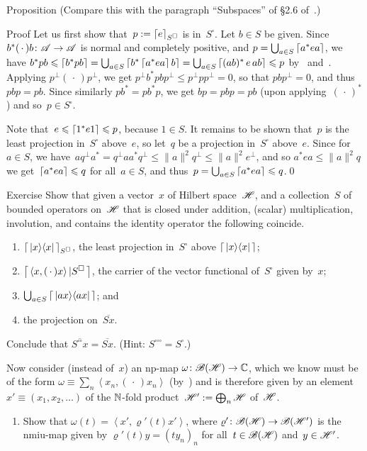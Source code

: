 \documentclass[a]{subfiles}
\begin{document}
\begin{parsec}
\begin{point}{Proposition}
(Compare this with the paragraph ``Subspaces'' of \S2.6 of~\cite{kr}.)
\begin{point}{Proof}%
Let us first show that~$p:= \left\lceil e\right\rceil_{S^\square}$
is in~$S^\square$.
Let $b\in S$ be given.
Since~$b^*(\,\cdot\,)b\colon \mathscr{A}\to\mathscr{A}$
is normal and completely positive,
and $p=\bigcup_{a\in S} \left\lceil a^*ea\right\rceil$,
we have $b^*pb\leqslant \left\lceil b^*pb\right\rceil = 
\bigcup_{a\in S} \left\lceil b^* \left\lceil a^* e a\right\rceil b \right\rceil
= \bigcup_{a\in S} \left\lceil(ab)^* \,e\, ab\right\rceil \leqslant p$
by~ and~.
Applying $p^\perp(\,\cdot\,)p^\perp$,
we get $p^\perp b^*pb p^\perp 
\leq p^\perp p p^\perp = 0$,
so that $pbp^\perp=0$,
and thus $pbp=pb$.
Since similarly $pb^* =pb^*p$,
we get  $bp=pbp=pb$
(upon applying~$(\,\cdot\,)^*$) and so~$p\in S^\square$.

Note that~$e\leqslant \left\lceil1^* e 1\right\rceil\leqslant p$, because $1\in S$.
It remains to be shown that~$p$ is the least projection in~$S^\square$
above~$e$, so let~$q$ be a projection in~$S^\square$ above~$e$.
Since for~$a\in S$,
we have~$aq^\perp a^*=  q^\perp aa^* q^\perp 
\leq \|a\|^2q^\perp \leq \|a\|^2e^\perp$,
and so $a^*ea\leq \|a\|^2q$ 
we get~$\left\lceil a^*ea\right\rceil\leqslant q$
for all~$a\in S$,
and thus~$p=\bigcup_{a\in S}\left\lceil a^*ea\right\rceil \leqslant q$.\qed
\end{point}
\end{point}

\begin{point}{Exercise}%
Show that given a vector~$x$ of Hilbert space~$\mathscr{H}$,
and a collection~$S$ of bounded operators on~$\mathscr{H}$
that is closed under addition, (scalar) multiplication,
involution, and contains the identity operator
the following coincide.
\begin{enumerate}
\item
$\left\lceil\,\left|x\right>\!\left<x\right|\,\right\rceil_{S^\square}$,
the least projection in~$S^\square$
above $\left\lceil\,\left|x\right>\!\left<x\right|\,\right\rceil$;
\item
$\left\lceil\,\left<x,(\,\cdot\,)x\right>|S^\square\,\right\rceil$,
the carrier of the vector functional of~$S^\square$
given by~$x$;
\item
$\bigcup_{a\in S} \left\lceil\,\left|ax\right>\!\left<ax\right|\,\right\rceil$; and 
\item
the projection on~$\overline{S x}$.
\end{enumerate}
Conclude that $\overline{S^{\square\square}x}
=\overline{S x}$.
(Hint: $S^{\square\square\square}=S^\square$.)
\begin{point}%
Now consider
(instead of~$x$)
an np-map $\omega\colon \mathscr{B}(\mathscr{H})\to \mathbb{C}$,
which we know must be of the form
$\omega\equiv \sum_n \left<x_n,(\,\cdot\,)x_n\right>$
(by~)
and is therefore given by 
an element $x'\equiv (x_1,x_2,\dotsc)$ of the $\mathbb{N}$-fold
product~$\mathscr{H}':=\bigoplus_n\mathscr{H}$ of~$\mathscr{H}$.
\begin{enumerate}
\item
Show that  $\omega(t)=\left<x',\varrho'(t)x'\right>$,
where $\varrho'\colon \mathscr{B}(\mathscr{H})\to\mathscr{B}(\mathscr{H}')$
is the nmiu-map given by 
$\varrho'(t)y=(ty_n)_n$
for all~$t\in\mathscr{B}(\mathscr{H})$ and~$y\in\mathscr{H}'$.


\end{enumerate}
\end{point}
\end{point}
\end{parsec}
\end{document}
